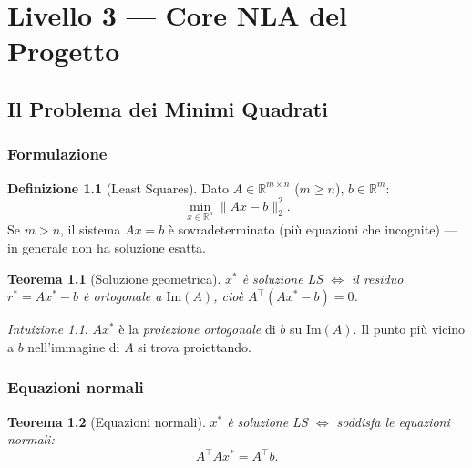\documentclass[11pt, a4paper, twoside]{book}
\theoremstyle{definition}
\newtheorem{defn}{Definizione}[chapter]
\theoremstyle{plain}
\newtheorem{thm}{Teorema}[chapter]
\theoremstyle{remark}
\newtheorem{intuition}{Intuizione}[chapter]
\newcommand{\R}{\mathbb{R}}
\begin{document}

\part{Livello 3 --- Core NLA del Progetto}
\label{part:L3-nla}

\chapter{Il Problema dei Minimi Quadrati}

\section{Formulazione}

\begin{defn}[Least Squares]
Dato $A \in \R^{m \times n}$ ($m \geq n$), $b \in \R^m$:
\[
  \min_{x \in \R^n} \|Ax - b\|_2^2.
\]
Se $m > n$, il sistema $Ax = b$ è sovradeterminato (più equazioni che incognite) — in generale non ha soluzione esatta.
\end{defn}

\begin{thm}[Soluzione geometrica]
$x^*$ è soluzione LS $\Leftrightarrow$ il residuo $r^* = Ax^* - b$ è ortogonale a $\mathrm{Im}(A)$, cioè $A^\top(Ax^* - b) = 0$.
\end{thm}

\begin{intuition}
$Ax^*$ è la \emph{proiezione ortogonale} di $b$ su $\mathrm{Im}(A)$. Il punto più vicino a $b$ nell'immagine di $A$ si trova proiettando.
\end{intuition}

\section{Equazioni normali}
\label{sec:equazioni-normali}

\begin{thm}[Equazioni normali]
$x^*$ è soluzione LS $\Leftrightarrow$ soddisfa le \emph{equazioni normali}:
\[
  A^\top A x^* = A^\top b.
\]
\end{thm}
\end{document}

